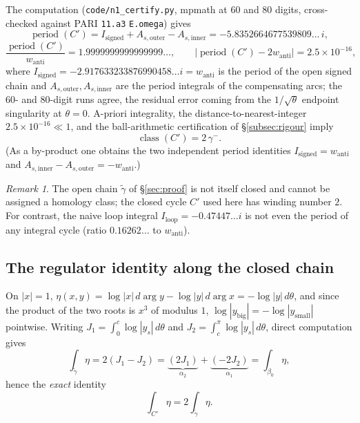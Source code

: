 \documentclass[11pt]{amsart}
\theoremstyle{definition}
\theoremstyle{remark}
\newtheorem{remark}[theorem]{Remark}
\DeclareMathOperator{\period}{period}
\DeclareMathOperator{\class}{class}
\begin{document}
The computation (\texttt{code/n1\_certify.py}, mpmath at $60$ and $80$
digits, cross-checked against PARI \texttt{11.a3} \texttt{E.omega}) gives
\begin{equation}\label{eq:period}
  \period(C')=I_{\mathrm{signed}}+A_{s,\mathrm{outer}}-A_{s,\mathrm{inner}}
  =-5.8352664677539809\ldots\,i,
\end{equation}
\[
  \frac{\period(C')}{w_{\mathrm{anti}}}=1.9999999999999999\ldots,\qquad
  \big|\period(C')-2w_{\mathrm{anti}}\big|=2.5\times10^{-16},
\]
where $I_{\mathrm{signed}}=-2.917633233876990458\ldots i=w_{\mathrm{anti}}$
is the period of the open signed chain and
$A_{s,\mathrm{outer}},A_{s,\mathrm{inner}}$ are the period integrals of the
compensating arcs; the $60$- and $80$-digit runs agree, the residual error
coming from the $1/\sqrt\theta$ endpoint singularity at $\theta=0$. A-priori
integrality, the distance-to-nearest-integer $2.5\times10^{-16}\ll 1$, and
the ball-arithmetic certification of \S\ref{subsec:rigour} imply
\[
  \boxed{\class(C')=2\,\gamma^-}.
\]
(As a by-product one obtains the two independent period identities
$I_{\mathrm{signed}}=w_{\mathrm{anti}}$ and
$A_{s,\mathrm{inner}}-A_{s,\mathrm{outer}}=-w_{\mathrm{anti}}$.)

\begin{remark}
The open chain $\tilde\gamma$ of \S\ref{sec:proof} is not itself closed
and cannot be assigned a homology class; the closed cycle $C'$ used here
has winding number $2$. For
contrast, the naive loop integral $I_{\mathrm{loop}}=-0.47447\ldots i$ is not
even the period of any integral cycle (ratio $0.16262\ldots$ to
$w_{\mathrm{anti}}$).
\end{remark}

\subsection{The regulator identity along the closed chain}

On $|x|=1$, $\eta(x,y)=\log|x|\,d\arg y-\log|y|\,d\arg x=-\log|y|\,d\theta$,
and since the product of the two roots is $x^3$ of modulus $1$,
$\log|y_{\mathrm{big}}|=-\log|y_{\mathrm{small}}|$ pointwise. Writing
$J_1=\int_0^c\log|y_s|\,d\theta$ and $J_2=\int_c^\pi\log|y_s|\,d\theta$,
direct computation gives
\[
  \int_{\tilde\gamma}\eta=2(J_1-J_2)
  =\underbrace{(2J_1)}_{\alpha_2}+\underbrace{(-2J_2)}_{\alpha_1}
  =\int_{\beta_0}\eta,
\]
hence the \emph{exact} identity
\begin{equation}\label{eq:double}
  \int_{C'}\eta=2\int_{\tilde\gamma}\eta.
\end{equation}
\end{document}
